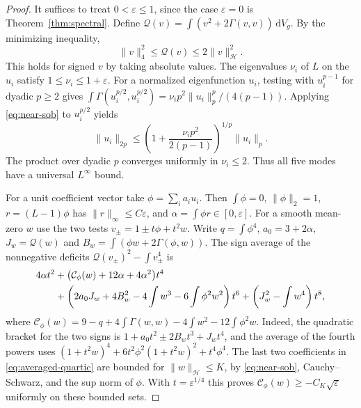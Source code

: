 \documentclass[11pt]{article}
\numberwithin{equation}{section}
\newcommand{\dd}{\mathrm{d}}
\newcommand{\e}{\varepsilon}
\newcommand{\norm}[1]{\lVert #1\rVert}
\newcommand{\dv}{\dd V_g}
\begin{document}
\begin{proof}
It suffices to treat \(0<\e\le1\), since the case \(\e=0\)
is Theorem~\ref{thm:spectral}. Define
\(\mathcal Q(v)=\int(v^2+2\Gamma(v,v))\,\dv\).
By the minimizing inequality,
\begin{equation}\label{eq:near-sob}
 \norm v_4^2\le\mathcal Q(v)\le2\norm v_{\mathcal H}^2.
\end{equation}
This holds for signed \(v\) by taking absolute values.
The eigenvalues \(\nu_i\) of \(L\) on the \(u_i\) satisfy
\(1\le\nu_i\le1+\e\). For a normalized eigenfunction \(u_i\),
testing with \(u_i^{p-1}\) for dyadic \(p\ge2\) gives
\(\int\Gamma(u_i^{p/2},u_i^{p/2})=
\nu_i p^2\norm{u_i}_p^p/(4(p-1))\).
Applying \eqref{eq:near-sob} to \(u_i^{p/2}\) yields
\[
 \norm{u_i}_{2p}\le
 \left(1+\frac{\nu_i p^2}{2(p-1)}\right)^{1/p}\norm{u_i}_p .
\]
The product over dyadic \(p\) converges uniformly in
\(\nu_i\le2\). Thus all five modes have a universal
\(L^\infty\) bound.

For a unit coefficient vector take \(\phi=\sum_i a_i u_i\).
Then \(\int\phi=0\), \(\norm{\phi}_2=1\),
\(r=(L-1)\phi\) has \(\norm r_\infty\le C\e\), and
\(\alpha=\int\phi r\in[0,\e]\).
For a smooth mean-zero \(w\) use the two tests
\(v_\pm=1\pm t\phi+t^2w\).
Write \(q=\int\phi^4\), \(a_0=3+2\alpha\),
\(J_w=\mathcal Q(w)\) and \(B_w=\int(\phi w+2\Gamma(\phi,w))\).
The sign average of the nonnegative deficits
\(\mathcal Q(v_\pm)^2-\int v_\pm^4\) is
\begin{align}
 4\alpha t^2
 &+\bigl(\mathcal C_\phi(w)+12\alpha+4\alpha^2\bigr)t^4\notag\\
 &+\left(2a_0J_w+4B_w^2-4\int w^3-6\int\phi^2w^2\right)t^6
  +\left(J_w^2-\int w^4\right)t^8 ,
 \label{eq:averaged-quartic}
\end{align}
where \(\mathcal C_\phi(w)=9-q+4\int\Gamma(w,w)
-4\int w^2-12\int\phi^2w\).
Indeed, the quadratic bracket for the two signs is
\(1+a_0t^2\pm2B_wt^3+J_wt^4\), and the average of the
fourth powers uses \((1+t^2w)^4+6t^2\phi^2(1+t^2w)^2+t^4\phi^4\).
The last two coefficients in \eqref{eq:averaged-quartic} are
bounded for \(\norm w_{\mathcal H}\le K\), by
\eqref{eq:near-sob}, Cauchy--Schwarz, and the sup norm of \(\phi\).
With \(t=\e^{1/4}\) this proves
\(\mathcal C_\phi(w)\ge-C_K\sqrt\e\) uniformly on these bounded sets.


\end{proof}
\end{document}
